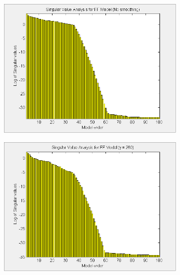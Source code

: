\begin{landscape}
\begin{figure}[H]
\centering
\begin{subfigure}[b]{0.4\textwidth}
\includegraphics[width=1.0\textwidth]{pics/SVD_FF_inf}
\caption{}
\label{pic:}
\end{subfigure}\;\begin{subfigure}[b]{0.4\textwidth}
\includegraphics[width=1.0\textwidth]{pics/SVD_FF_200}
\caption{}
\label{pic:}
\end{subfigure}\;\begin{subfigure}[b]{0.4\textwidth}

\end{subfigure}
\end{figure}
\end{landscape}
